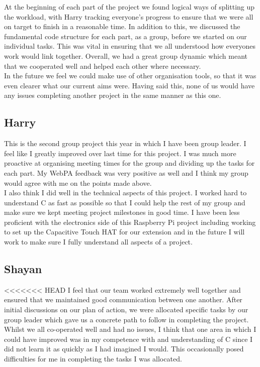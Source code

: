 \documentclass[11pt]{article}
\begin{document}
At the beginning of each part of the project we found logical ways of splitting up the workload, with Harry tracking everyone's progress to ensure that we were all on target to finish in a reasonable time. In addition to this, we discussed the fundamental code structure for each part, as a group, before we started on our individual tasks. This was vital in ensuring that we all understood how everyones work would link together. Overall, we had a great group dynamic which meant that we cooperated well and helped each other where necessary. \\

In the future we feel we could make use of other organisation tools, so that it was even clearer what our current aims were. Having said this, none of us would have any issues completing another project in the same manner as this one.

\subsection{Harry}
This is the second group project this year in which I have been group leader. I feel like I greatly improved over last time for this project. I was much more proactive at organising meeting times for the group and dividing up the tasks for each part. My WebPA feedback was very positive as well and I think my group would agree with me on the points made above.\\

 I also think I did well in the technical aspects of this project. I worked hard to understand C as fast as possible so that I could help the rest of my group and make sure we kept meeting project milestones in good time. I have been less proficient with the electronics side of this Raspberry Pi project including working to set up the Capacitive Touch HAT for our extension and in the future I will work to make sure I fully understand all aspects of a project.

\subsection{Shayan}
<<<<<<< HEAD
I feel that our team worked extremely well together and ensured that we maintained good communication between one another. After initial discussions on our plan of action, we were allocated specific tasks by our group leader which gave us a concrete path to follow in completing the project. Whilst we all co-operated well and had no issues, I think that one area in which I could have improved was in my competence with and understanding of C since I did not learn it as quickly as I had imagined I would. This occasionally posed difficulties for me in completing the tasks I was allocated. \\
\end{document}
